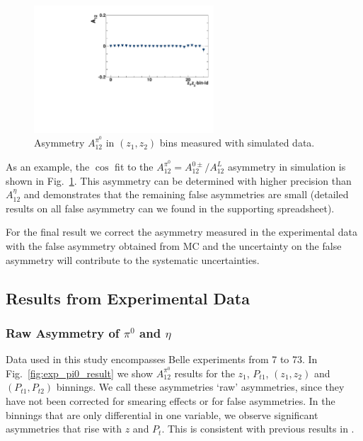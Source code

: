 \begin{figure}[H]
    \centering
    \includegraphics[width=0.6\textwidth,natwidth=250,natheight=100]{figure_asy/ComZ_Phi12_pi0.pdf}
    \caption{Asymmetry $A_{12}^{\pi^0}$ in  $(z_1,z_{2})$ bins measured with simulated data.}
    \label{fig:mc_example}
\end{figure}
As an example, the $\cos$ fit to the $A_{12}^{\pi^0}=A_{12}^{0\pm}/A_{12}^L$ asymmetry in simulation is shown in Fig.~\ref{fig:mc_example}. This asymmetry can be determined with  higher precision than $A_{12}^{\eta}$ and demonstrates that the remaining false asymmetries are small (detailed results on all false asymmetry can we found in the supporting spreadsheet).

For the final result we correct the asymmetry measured in the experimental data with the false asymmetry obtained from MC and the uncertainty on the false asymmetry will contribute to the systematic uncertainties.

\subsection{Results from Experimental Data}
\label{sec:resultsfromexp}
\subsubsection{\texorpdfstring{Raw Asymmetry of $\pi^0$ and $\eta$}{Raw Asymmetry of pi0 and eta}}
Data used in this study encompasses Belle experiments from 7 to 73.
 In Fig.~\ref{fig:exp_pi0_result} we show  $A_{12}^{\pi^0}$ results for the $z_1$, $P_{t1}$, $(z_1,z_2)$ and $(P_{t1},P_{t2})$ binnings. We call these asymmetries `raw' asymmetries, since they have not been corrected for smearing effects or for false asymmetries. 
In the binnings that are only differential in one variable, we observe significant asymmetries that rise with $z$ and $P_{t}$. This is consistent with previous results in \cite{ChargedPionResult2, ChargedPionResult}.

